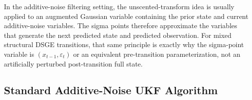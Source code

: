 In the additive-noise filtering setting, the unscented-transform idea is usually
applied to an augmented Gaussian variable containing the prior state and current
additive-noise variables.  The sigma points therefore approximate the variables
that generate the next predicted state and predicted observation.  For mixed
structural DSGE transitions, that same principle is exactly why the sigma-point
variable is $(x_{t-1},\varepsilon_t)$ or an equivalent pre-transition
parameterization, not an artificially perturbed post-transition full state.

\subsection{Standard Additive-Noise UKF Algorithm}
\label{sec:bf-standard-ukf-algorithm}

